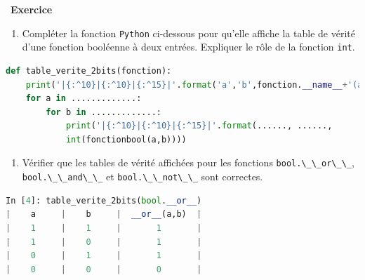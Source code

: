 \documentclass[
  11pt,
]{article}
\newcommand{\passthrough}[1]{#1}
\providecommand{\tightlist}{%
  \setlength{\itemsep}{0pt}\setlength{\parskip}{0pt}}
\newcounter{exo}
\newenvironment{exercice}[1]
{\par \medskip   \addtocounter{exo}{1} \noindent  
\begin{bclogo}[arrondi =0.1,   noborder = true, logo=\bccrayon, marge=4]{~\textbf{Exercice} \textbf{\theexo} {\itshape #1} }  \par}
{
\end{bclogo}
 \par \bigskip }
\newcounter{def}
\begin{document}
\begin{exercice}{}

\begin{enumerate}
\def\labelenumi{\arabic{enumi}.}
\tightlist
\item
  Compléter la fonction \passthrough{\lstinline!Python!} ci-dessous pour
  qu'elle affiche la table de vérité d'une fonction booléenne à deux
  entrées. Expliquer le rôle de la fonction
  \passthrough{\lstinline!int!}.
\end{enumerate}

\begin{lstlisting}[language=Python]
def table_verite_2bits(fonction):
    print('|{:^10}|{:^10}|{:^15}|'.format('a','b',fonction.__name__+'(a,b)'))
    for a in .............:
        for b in .............:
            print('|{:^10}|{:^10}|{:^15}|'.format(......, ......, 
            int(fonctionbool(a,b))))
\end{lstlisting}

\begin{enumerate}
\def\labelenumi{\arabic{enumi}.}
\tightlist
\item
  Vérifier que les tables de vérité affichées pour les fonctions
  \passthrough{\lstinline!bool.\_\_or\_\_!},
  \passthrough{\lstinline!bool.\_\_and\_\_!} et
  \passthrough{\lstinline!bool.\_\_not\_\_!} sont correctes.
\end{enumerate}

\begin{lstlisting}[language=Python]
In [4]: table_verite_2bits(bool.__or__)                                                                                                                                           
|    a     |    b     |  __or__(a,b)  |
|    1     |    1     |       1       |
|    1     |    0     |       1       |
|    0     |    1     |       1       |
|    0     |    0     |       0       |
\end{lstlisting}

\end{exercice}
\end{document}
